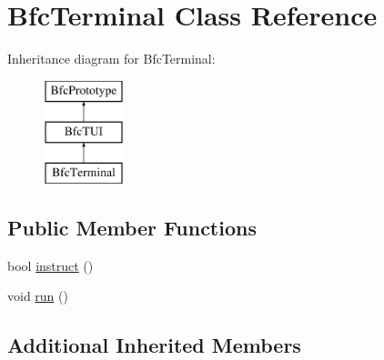 \hypertarget{classBfcTerminal}{\section{Bfc\-Terminal Class Reference}
\label{classBfcTerminal}
}
Inheritance diagram for Bfc\-Terminal\-:\begin{figure}[H]
\begin{center}
\leavevmode
\includegraphics[height=3.000000cm]{classBfcTerminal}
\end{center}
\end{figure}
\subsection*{Public Member Functions}
\begin{DoxyCompactItemize}
\item 
bool \hyperlink{classBfcTerminal_a9c64b0047d71da5ecbda47e85c29e9a9}{instruct} ()
\item 
void \hyperlink{classBfcTerminal_afcd4a80a531b32527c058cf3c341a9b7}{run} ()
\end{DoxyCompactItemize}
\subsection*{Additional Inherited Members}


